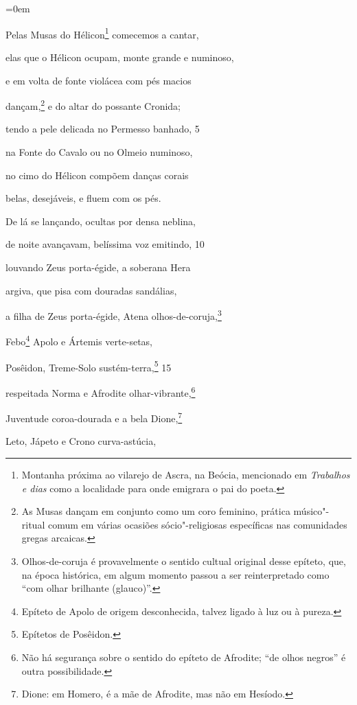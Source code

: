 \chapter*{}

\begingroup\parindent=0em

Pelas Musas do Hélicon\footnote{Montanha próxima ao vilarejo de Ascra, na Beócia, mencionado
em \emph{Trabalhos e dias} como a localidade para onde emigrara o pai do
poeta.} comecemos a cantar,

elas que o Hélicon ocupam, monte grande e numinoso,

e em volta de fonte violácea com pés macios

dançam,\footnote{As Musas dançam em conjunto como um coro feminino, prática
músico"-ritual comum em várias ocasiões sócio"-religiosas específicas nas
comunidades gregas arcaicas.} e do altar do possante Cronida;

tendo a pele delicada no Permesso banhado, \num{5}

na Fonte do Cavalo ou no Olmeio numinoso,

no cimo do Hélicon compõem danças corais

belas, desejáveis, e fluem com os pés.

\quad{}De lá se lançando, ocultas por densa neblina,

de noite avançavam, belíssima voz emitindo, \num{10}

louvando Zeus porta-égide, a soberana Hera

argiva, que pisa com douradas sandálias,

a filha de Zeus porta-égide, Atena olhos-de-coruja,\footnote{Olhos-de-coruja é provavelmente o sentido cultual original desse
epíteto, que, na época histórica, em algum momento passou a ser
reinterpretado como ``com olhar brilhante (glauco)''.}

Febo\footnote{Epíteto de Apolo de origem desconhecida, talvez ligado à luz
ou à pureza.} Apolo e Ártemis verte-setas,

Posêidon, Treme-Solo sustém-terra,\footnote{Epítetos de Posêidon.} \num{15}

respeitada Norma e Afrodite olhar-vibrante,\footnote{Não há segurança sobre o sentido do epíteto de Afrodite; ``de olhos
negros'' é outra possibilidade.}

Juventude coroa-dourada e a bela Dione,\footnote{Dione: em Homero, é a mãe de Afrodite, mas não em Hesíodo.}

Leto, Jápeto e Crono curva-astúcia,

